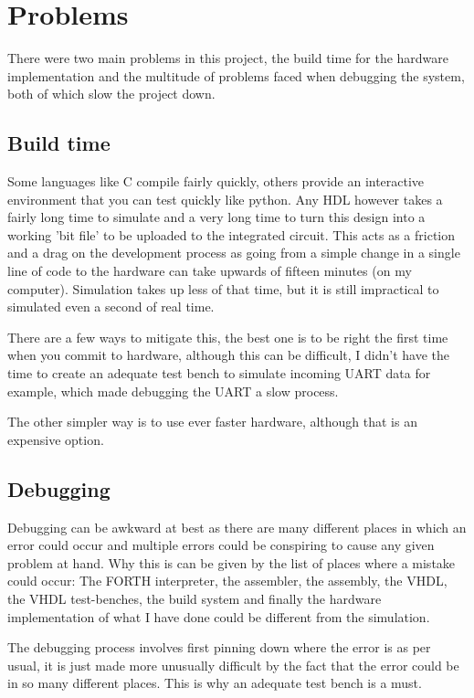 \documentclass	[a4paper, 10pt]	{article}
\begin{document}
  \section{Problems}

    There were two main problems in this project, the build time for the hardware
    implementation and the multitude of problems faced when debugging the system,
    both of which slow the project down.

    \subsection{Build time}

    Some languages like C compile fairly quickly, others provide an interactive
    environment that you can test quickly like python. Any HDL however takes
    a fairly long time to simulate and a very long time to turn this design into
    a working 'bit file' to be uploaded to the integrated circuit. This acts as
    a friction and a drag on the development process as going from a simple change
    in a single line of code to the hardware can take upwards of fifteen minutes
    (on my computer). Simulation takes up less of that time, but it is still
    impractical to simulated even a second of real time. 

    There are a few ways
    to mitigate this, the best one is to be right the first time when you commit
    to hardware, although this can be difficult, I didn't have the time to create
    an adequate test bench to simulate incoming UART data for example, which made
    debugging the UART a slow process.

    The other simpler way is to use ever faster hardware, although that is an
    expensive option.

    \subsection{Debugging}

    Debugging can be awkward at best as there are many different places in which
    an error could occur and multiple errors could be conspiring to cause any
    given problem at hand. Why this is can be given by the list of places where
    a mistake could occur: The FORTH interpreter, the assembler, the assembly, the
    VHDL, the VHDL test-benches, the build system and finally the hardware implementation
    of what I have done could be different from the simulation. 

    The debugging process involves first pinning down where the error is as
    per usual, it is just made more unusually difficult by the fact that the error
    could be in so many different places. This is why an adequate test bench is
    a must.
\end{document}
